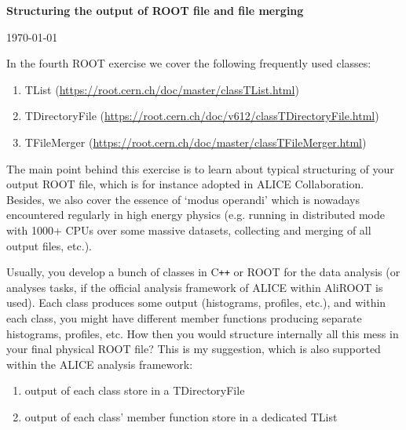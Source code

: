 \documentclass[11pt]{article}
\begin{document}
\begin{center}
\Large{\bf{Structuring the output of ROOT file and file merging}}\\
\end{center}
\begin{center}
{\small\today}
\end{center}

\bigskip

\noindent In the fourth ROOT exercise we cover the following frequently used classes:
%
\begin{enumerate}
\item TList (\url{https://root.cern.ch/doc/master/classTList.html})
\item TDirectoryFile (\url{https://root.cern.ch/doc/v612/classTDirectoryFile.html}) 
\item TFileMerger (\url{https://root.cern.ch/doc/master/classTFileMerger.html}) 
\end{enumerate} 
%

\noindent The main point behind this exercise is to learn about typical structuring of your output ROOT file, which is for instance adopted in ALICE Collaboration. Besides, we also cover the essence of `modus operandi' which is nowadays encountered regularly in high energy physics (e.g. running in distributed mode with 1000+ CPUs over some massive datasets, collecting and merging of all output files, etc.).

Usually, you develop a bunch of classes in C\texttt{++} or ROOT for the data analysis (or analyses tasks, if the official analysis framework of ALICE within AliROOT is used). Each class produces some output (histograms, profiles, etc.), and within each class, you might have different member functions producing separate histograms, profiles, etc. How then you would structure internally all this mess in your final physical ROOT file? This is my suggestion, which is also supported within the ALICE analysis framework:
%
\begin{enumerate}
\item output of each class store in a TDirectoryFile
\item output of each class' member function store in a dedicated TList
\end{enumerate}
\end{document}
